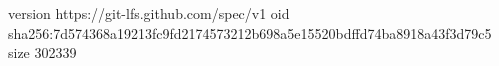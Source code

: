 version https://git-lfs.github.com/spec/v1
oid sha256:7d574368a19213fc9fd2174573212b698a5e15520bdffd74ba8918a43f3d79c5
size 302339
